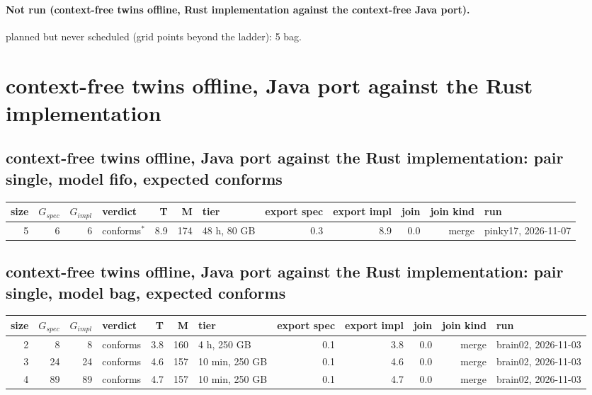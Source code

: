 \documentclass[10pt]{article}
\begin{document}
\paragraph{Not run (context-free twins offline, Rust implementation against the context-free Java port).}
planned but never scheduled (grid points beyond the ladder): 5 bag.\par
\section*{context-free twins offline, Java port against the Rust implementation}
\subsection*{context-free twins offline, Java port against the Rust implementation: pair \textsf{single}, model fifo, expected conforms}
\begin{longtable}{@{}rrrlrrlrrrrl@{}}
\toprule
size & $G_{\mathit{spec}}$ & $G_{\mathit{impl}}$ & verdict & T & M & tier & export spec & export impl & join & join kind & run \\
\midrule
\endhead
\color{red} 5 & 6 & 6 & conforms$^{\ast}$ & 8.9 & 174 & 48 h, 80 GB & 0.3 & 8.9 & 0.0 & merge & pinky17, 2026-11-07 \\
\bottomrule
\end{longtable}
\subsection*{context-free twins offline, Java port against the Rust implementation: pair \textsf{single}, model bag, expected conforms}
\begin{longtable}{@{}rrrlrrlrrrrl@{}}
\toprule
size & $G_{\mathit{spec}}$ & $G_{\mathit{impl}}$ & verdict & T & M & tier & export spec & export impl & join & join kind & run \\
\midrule
\endhead
\color{blue} 2 & 8 & 8 & conforms & 3.8 & 160 & 4 h, 250 GB & 0.1 & 3.8 & 0.0 & merge & brain02, 2026-11-03 \\
\color{blue} 3 & 24 & 24 & conforms & 4.6 & 157 & 10 min, 250 GB & 0.1 & 4.6 & 0.0 & merge & brain02, 2026-11-03 \\
\color{blue} 4 & 89 & 89 & conforms & 4.7 & 157 & 10 min, 250 GB & 0.1 & 4.7 & 0.0 & merge & brain02, 2026-11-03 \\
\bottomrule
\end{longtable}
\end{document}
